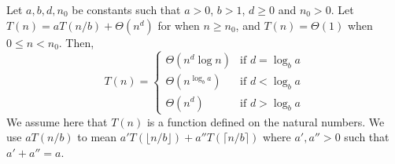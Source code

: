 \documentclass{article}
\begin{document}
\clearpage

\begin{theorem}
Let $a, b, d, n_0$ be constants such that $a > 0$, $b > 1$, $d \ge 0$ and $n_0 > 0$.
Let $T(n) = aT(n/b) + \Theta(n^d)$ for when $n \ge n_0$, and $T(n) = \Theta(1)$ when $0 \le n < n_0$. Then,
\[
T(n) = \begin{cases}
\Theta(n^d \log n) & \text{if } d = \log_b a \\
\Theta(n^{\log_b a}) & \text{if } d < \log_b a \\
\Theta(n^d) & \text{if } d > \log_b a
\end{cases}
\]
We assume here that $T(n)$ is a function defined on the natural numbers. We use $aT(n/b)$ to mean $a' T(\lfloor n/b \rfloor) + a'' T(\lceil n/b \rceil)$ where $a', a'' > 0$ such that $a' + a'' = a$.
\end{theorem}
\end{document}
